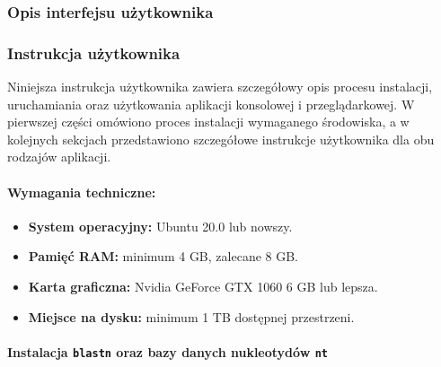         \subsubsection{Opis interfejsu użytkownika}

        \subsubsection{Instrukcja użytkownika}

            Niniejsza instrukcja użytkownika zawiera szczegółowy opis procesu instalacji, uruchamiania oraz użytkowania aplikacji konsolowej i przeglądarkowej. W pierwszej części omówiono proces instalacji wymaganego środowiska, a w kolejnych sekcjach przedstawiono szczegółowe instrukcje użytkownika dla obu rodzajów aplikacji.

            \paragraph{Wymagania techniczne:}
                \begin{itemize}
                    \item {
                        \textbf{System operacyjny:} Ubuntu 20.0 lub nowszy.
                    }
                    \item {
                        \textbf{Pamięć RAM:} minimum 4 GB, zalecane 8 GB.
                    }
                    \item {
                        \textbf{Karta graficzna:} Nvidia GeForce GTX 1060 6 GB lub lepsza.
                    }
                    \item {
                        \textbf{Miejsce na dysku:} minimum 1 TB dostępnej przestrzeni.
                    }
                \end{itemize}

            \paragraph{Instalacja \texttt{blastn} oraz bazy danych nukleotydów \texttt{nt}}

